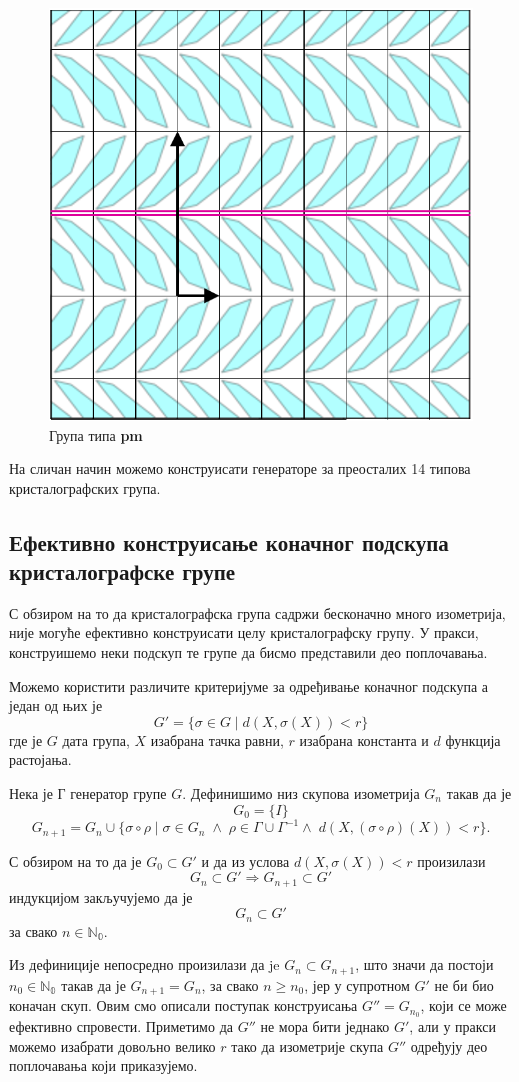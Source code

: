 \documentclass[12pt]{article}
\begin{document}
\begin{figure}[H]
\centering
    \includegraphics[width=.3\textwidth]{strelice_pm.png}
  
    \caption{Група типа \textbf{pm}}
      \label{fig:plavopm}
  \end{figure}



На сличан начин можемо конструисати генераторе за преосталих 14 типова кристалографских група.
\newpage
\subsection{Ефективно конструисање коначног подскупа кристалографске групе}

С обзиром на то да кристалографска група садржи бесконачно много изометрија, није могуће ефективно конструисати целу кристалографску групу. У пракси, конструишемо неки подскуп те групе да  бисмо представили део поплочавања.

Можемо користити различите критеријуме за одређивање коначног подскупа а један од њих је $$G' = \{\sigma \in G \;|\; d(X,\sigma(X)) < r\} $$ где је $G$ дата група, $X$ изабрана тачка равни, $r$ изабрана константа и $d$ функција растојања.

Нека је Г генератор групе $G$. Дефинишимо низ скупова изометрија $G_n$ такав да је $$G_0 = \{I\}$$
$$G_{n+1} = G_n \cup \{\sigma \circ \rho \;|\; \sigma \in G_n\; \wedge \; \rho \in \Gamma \cup \Gamma^{-1} \wedge \; d(X,(\sigma \circ \rho)(X)) < r \}. $$

С обзиром на то да је $G_0 \subset G'$ и да из услова $d(X,\sigma(X)) < r$ произилази 
$$G_n \subset G' \Rightarrow G_{n+1} \subset G'$$ индукцијом закључујемо да је $$G_n \subset G'$$ за свако $n \in \mathbb{N_0}.$

Из дефиниције непосредно произилази да je $G_n \subset G_{n+1}$, што значи да постоји \\ $n_0\in \mathbb{N_0}$ такав да је $G_{n+1} = G_n$, за свако $n\geq n_0$, јер у супротном $G'$ не би био коначан скуп. Овим смо описали поступак конструисања $G''= G_{n_0}$, који се може ефективно спровести. Приметимо да $G''$ не мора бити једнако $G'$, али у пракси можемо изабрати довољно велико $r$ тако да  изометрије скупа $G''$ одређују део поплочавања који приказујемо. 
\end{document}
